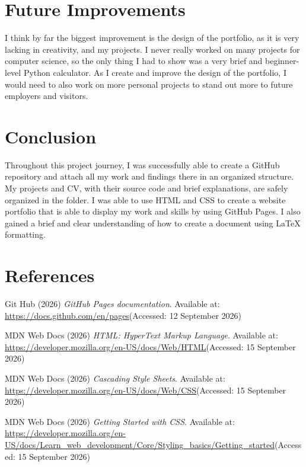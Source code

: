 \documentclass[12pt,a4paper]{article}
\begin{document}
\section{Future Improvements}
I think by far the biggest improvement is the design of the portfolio, as it is very lacking in creativity, and my projects. I never really worked on many projects for computer science, so the only thing I had to show was a very brief and beginner-level Python calculator. As I create and improve the design of the portfolio, I would need to also work on more personal projects to stand out more to future employers and visitors.


\section{Conclusion}
Throughout this project journey, I was successfully able to create a GitHub repository and attach all my work and findings there in an organized structure. My projects and CV, with their source code and brief explanations, are safely organized in the folder. I was able to use HTML and CSS to create a website portfolio that is able to display my work and skills by using GitHub Pages. I also gained a brief and clear understanding of how to create a document using LaTeX formatting.


\section{References}
Git Hub (2026) \textit{GitHub Pages documentation}. Available at: \url{https://docs.github.com/en/pages}(Accessed: 12 September 2026)

MDN Web Docs (2026) \textit{HTML: HyperText Markup Language}. Available at: \url{https://developer.mozilla.org/en-US/docs/Web/HTML}(Accessed: 15 September 2026)

MDN Web Docs (2026) \textit{Cascading Style Sheets}. Available at: \url{https://developer.mozilla.org/en-US/docs/Web/CSS}(Accessed: 15 September 2026)

MDN Web Docs (2026) \textit{ Getting Started with CSS}. Available at: \url{https://developer.mozilla.org/en-US/docs/Learn_web_development/Core/Styling_basics/Getting_started}(Accessed: 15 September 2026)
\end{document}
